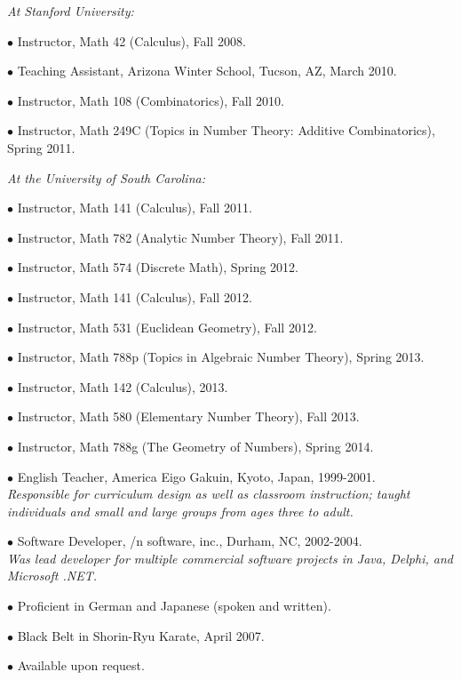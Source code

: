 \documentclass{article}
\newcommand{\categorywidth}{1in}        %
\newcommand{\infowidth}{5.8in}          %
\newcommand{\categorysep}{5pt}
\newcommand{\catlistlabel}[1]%
{\raisebox{0pt}[1ex][0pt]{\makebox[\labelwidth][l]%
    {\parbox[t]{\labelwidth}{\hspace{0pt}\textbf{#1}}}}}
\newenvironment{categories}{\begin{list}{}{
      \setlength{\labelwidth}{\categorywidth}
      \setlength{\leftmargin}{\labelwidth}
      \addtolength{\leftmargin}{\labelsep}
      \setlength{\topsep}{20pt}
      \setlength{\itemsep}{\categorysep}
      \renewcommand{\makelabel}{\catlistlabel}
      }}{\end{list}}
\newcommand{\category}[1]{\item[#1]}
\newcommand{\rawentry}[1]{{\begin{minipage}[t]{\infowidth}{#1}
    \end{minipage}}}
\begin{document}
\begin{flushleft}
\begin{categories}
  \rawentry{\itshape At Stanford University:}

  $\bullet$ {Instructor, Math 42 (Calculus), Fall 2008.}

  $\bullet$ {Teaching Assistant, Arizona Winter School, Tucson, AZ, March 2010.}

  $\bullet$ {Instructor, Math 108 (Combinatorics), Fall 2010.}

  $\bullet$ {Instructor, Math 249C (Topics in Number Theory: Additive Combinatorics), Spring 2011.}

  \rawentry{\itshape At the University of South Carolina:}

  $\bullet$ {Instructor, Math 141 (Calculus), Fall 2011.}

  $\bullet$ {Instructor, Math 782 (Analytic Number Theory), Fall 2011.}

  $\bullet$ {Instructor, Math 574 (Discrete Math), Spring 2012.}

  $\bullet$ {Instructor, Math 141 (Calculus), Fall 2012.}

  $\bullet$ {Instructor, Math 531 (Euclidean Geometry), Fall 2012.}

  $\bullet$ {Instructor, Math 788p (Topics in Algebraic Number Theory), Spring 2013.}

  $\bullet$ {Instructor, Math 142 (Calculus), 2013.}

  $\bullet$ {Instructor, Math 580 (Elementary Number Theory), Fall 2013.}

  $\bullet$ {Instructor, Math 788g (The Geometry of Numbers), Spring 2014.}

  \category{Non-Academic \\ Employment}
  
  $\bullet$ {English Teacher, America Eigo Gakuin, Kyoto, Japan, 1999-2001. \\
  \itshape Responsible for curriculum design as well as classroom instruction;
taught individuals and small and large groups from ages three to adult. \upshape}

  $\bullet$ {Software Developer, /n software, inc., Durham, NC, 2002-2004. \\
  \itshape Was lead developer for multiple commercial software projects in
Java, Delphi, and Microsoft .NET. \upshape}

  \category{Personal}

  $\bullet$ {Proficient in German and Japanese (spoken and written).}

  $\bullet$ {Black Belt in Shorin-Ryu Karate, April 2007.}

  \category{References}
 
  $\bullet$ {Available upon request.}

\end{categories}



\end{flushleft}
\end{document}
